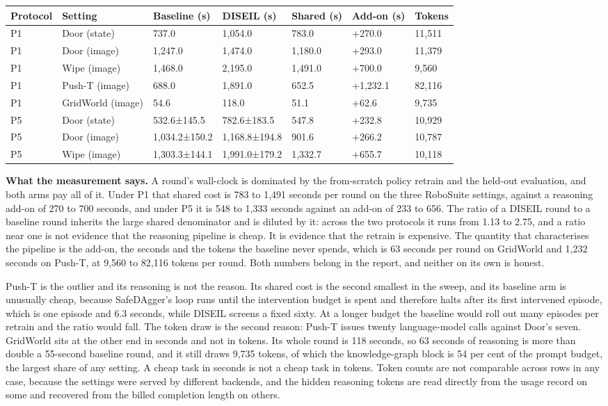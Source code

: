 \documentclass[
  11pt,
]{article}
\begin{document}
\begin{longtable}[]{@{}lllllll@{}}
\toprule
Protocol & Setting & Baseline (s) & DISEIL (s) & Shared (s) & Add-on (s)
& Tokens\tabularnewline
\midrule
\endhead
P1 & Door (state) & 737.0 & 1,054.0 & 783.0 & +270.0 &
11,511\tabularnewline
P1 & Door (image) & 1,247.0 & 1,474.0 & 1,180.0 & +293.0 &
11,379\tabularnewline
P1 & Wipe (image) & 1,468.0 & 2,195.0 & 1,491.0 & +700.0 &
9,560\tabularnewline
P1 & Push-T (image) & 688.0 & 1,891.0 & 652.5 & +1,232.1 &
82,116\tabularnewline
P1 & GridWorld (image) & 54.6 & 118.0 & 51.1 & +62.6 &
9,735\tabularnewline
P5 & Door (state) & 532.6±145.5 & 782.6±183.5 & 547.8 & +232.8 &
10,929\tabularnewline
P5 & Door (image) & 1,034.2±150.2 & 1,168.8±194.8 & 901.6 & +266.2 &
10,787\tabularnewline
P5 & Wipe (image) & 1,303.3±144.1 & 1,991.0±179.2 & 1,332.7 & +655.7 &
10,118\tabularnewline
\bottomrule
\end{longtable}

\textbf{What the measurement says.} A round's wall-clock is dominated by
the from-scratch policy retrain and the held-out evaluation, and both
arms pay all of it. Under P1 that shared cost is 783 to 1,491 seconds
per round on the three RoboSuite settings, against a reasoning add-on of
270 to 700 seconds, and under P5 it is 548 to 1,333 seconds against an
add-on of 233 to 656. The ratio of a DISEIL round to a baseline round
inherits the large shared denominator and is diluted by it: across the
two protocols it runs from 1.13 to 2.75, and a ratio near one is not
evidence that the reasoning pipeline is cheap. It is evidence that the
retrain is expensive. The quantity that characterises the pipeline is
the add-on, the seconds and the tokens the baseline never spends, which
is 63 seconds per round on GridWorld and 1,232 seconds on Push-T, at
9,560 to 82,116 tokens per round. Both numbers belong in the report, and
neither on its own is honest.

Push-T is the outlier and its reasoning is not the reason. Its shared
cost is the second smallest in the sweep, and its baseline arm is
unusually cheap, because SafeDAgger's loop runs until the intervention
budget is spent and therefore halts after its first intervened episode,
which is one episode and 6.3 seconds, while DISEIL screens a fixed
sixty. At a longer budget the baseline would roll out many episodes per
retrain and the ratio would fall. The token draw is the second reason:
Push-T issues twenty language-model calls against Door's seven.
GridWorld sits at the other end in seconds and not in tokens. Its whole
round is 118 seconds, so 63 seconds of reasoning is more than double a
55-second baseline round, and it still draws 9,735 tokens, of which the
knowledge-graph block is 54 per cent of the prompt budget, the largest
share of any setting. A cheap task in seconds is not a cheap task in
tokens. Token counts are not comparable across rows in any case, because
the settings were served by different backends, and the hidden reasoning
tokens are read directly from the usage record on some and recovered
from the billed completion length on others.
\end{document}
